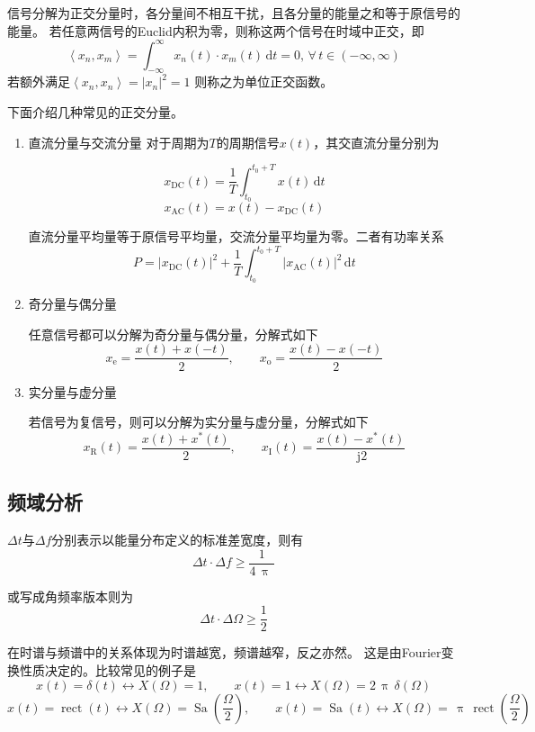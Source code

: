 \documentclass[UTF8,fontset=fandol,zihao=5]{ctexart}
\newcommand{\jj}{\,\mathrm{j}}
\newcommand{\dd}{\,\mathrm{d}}
\newcommand{\ppi}{\,\uppi\,}
\begin{document}
  信号分解为正交分量时，各分量间不相互干扰，且各分量的能量之和等于原信号的能量。
  若任意两信号的Euclid内积为零，则称这两个信号在时域中正交，即
  \[
  \left \langle  x_n, x_m \right \rangle  = \int_{-\infty}^{\infty} x_n(t) \cdot x_m(t) \dd t = 0, \, \forall \, t \in \left ( -\infty, \infty\right )
  \]
  若额外满足$\displaystyle \left \langle  x_n, x_n \right \rangle  = \left | x_n \right | ^2 = 1$
  则称之为单位正交函数。

  下面介绍几种常见的正交分量。

\begin{enumerate}

  \item 直流分量与交流分量
  对于周期为$T$的周期信号$x(t)$，其交直流分量分别为
  
  \[
  x_\mathrm{DC}(t) = \frac{1}{T} \int_{t_0}^{t_0+T} x(t) \dd t
  \]
  \[
  x_\mathrm{AC}(t) = x(t) - x_\mathrm{DC}(t)
  \]

  直流分量平均量等于原信号平均量，交流分量平均量为零。二者有功率关系
  \[
  P=\left | x_\mathrm{DC}(t) \right |^2 + \frac{1}{T} \int_{t_0}^{t_0+T} \left | x_\mathrm{AC}(t) \right |^2 \dd t
  \]

  \item 奇分量与偶分量
  
  任意信号都可以分解为奇分量与偶分量，分解式如下
  \[
  x_\mathrm{e} = \frac{x(t) + x(-t)}{2}
  ,\qquad
  x_\mathrm{o} = \frac{x(t) - x(-t)}{2}
  \]

  \item 实分量与虚分量
  
  若信号为复信号，则可以分解为实分量与虚分量，分解式如下
  \[
  x_\mathrm{R}(t)=\dfrac{x(t)+x^\ast(t)}{2}
  ,\qquad
  x_\mathrm{I}(t)=\dfrac{x(t)-x^\ast(t)}{\jj 2}
  \]

\end{enumerate}

\subsection{频域分析}

\begin{methodbox}[时频不确定性原理]

  $\Delta t$与$\Delta f$分别表示以能量分布定义的标准差宽度，则有
  \[
    \Delta t \cdot \Delta f \geq \frac{1}{4\ppi}
  \]

  或写成角频率版本则为
  \[
    \Delta t \cdot \Delta \varOmega \geq \frac12
  \]

  在时谱与频谱中的关系体现为时谱越宽，频谱越窄，反之亦然。
  这是由Fourier变换性质决定的。比较常见的例子是
  \[
  x(t)=\delta (t) \leftrightarrow X(\varOmega)=1, \qquad x(t)=1 \leftrightarrow X(\varOmega)=2\ppi \delta (\varOmega)
  \]
  \[
  x(t)=\operatorname{rect}(t) \leftrightarrow X(\varOmega)=\operatorname{Sa}\left (\dfrac{\varOmega}{2}\right ) , \qquad x(t)= \operatorname{Sa}(t) \leftrightarrow X(\varOmega)=\ppi \operatorname{rect}(\dfrac{\varOmega}{2})
  \]

\end{methodbox}
\end{document}
